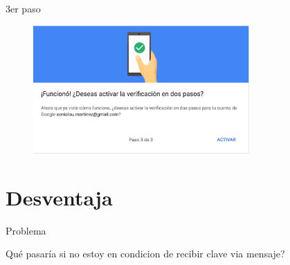 \documentclass[11pt]{beamer}
\begin{document}
\begin{frame}{3er paso}
  \begin{figure}
    \includegraphics[width=3.25in]{images/3paso.png}
  \end{figure}
\end{frame}
\section{Desventaja}
\begin{frame}{Problema}
  \begin{alertblock}{Qu\'e pasar\'ia si no estoy en condicion de recibir clave via mensaje?}
  \end{alertblock}
\end{frame}
\end{document}

